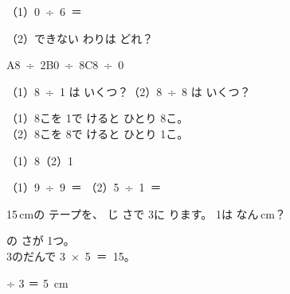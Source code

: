 \begin{jibun}
（1）\mbox{0 ÷ 6 ＝} \bkkakikomi\par\vspace{2pt}
（2）できない わりは どれ？\hfill\bkkakikomi\par
\hspace*{2\zw}A\enspace \mbox{8 ÷ 2}\hspace{3\zw}B\enspace \mbox{0 ÷ 8}\hspace{3\zw}C\enspace \mbox{8 ÷ 0}
\end{jibun}

\begin{reidai}[1で わる・\R{同}{おな}じ かずで わる]
（1）\mbox{8 ÷ 1} は いくつ？\hspace{2\zw}（2）\mbox{8 ÷ 8} は いくつ？

\kangaekata （1）8こを 1で けると ひとり 8こ。\\
\bkqmkindent（2）8こを 8で けると ひとり 1こ。

\kotae （1）8\hspace{2\zw}（2）1
\end{reidai}

\begin{jibun}
\noindent\hspace*{1\zw}（1）\mbox{9 ÷ 9 ＝} \bkkakikomi\hspace{3\zw}（2）\mbox{5 ÷ 1 ＝} \bkkakikomi
{}
\end{jibun}

\begin{reidai}[\R{長}{なが}さを \R{同}{おな}じに \R{分}{わ}ける]
15\,cmの テープを、 じ さで 3に ります。 1は なん\,cm？
\par\vspace{1pt}\noindent\hfill
{}\hfill\null\par\vspace{1pt}
の さが 1つ。\\
\bkqmkindent 3のだんで \mbox{3 × 5 ＝ 15}。

 ÷ 3 ＝ 5 \,cm
\end{reidai}

